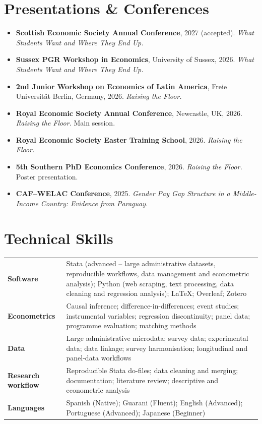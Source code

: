 \documentclass[10pt,a4paper]{article}
\begin{document}
\section{Presentations \& Conferences}
\begin{itemize}
  \item \textbf{Scottish Economic Society Annual Conference}, 2027 (accepted). \textit{What Students Want and Where They End Up.}
  \item \textbf{Sussex PGR Workshop in Economics}, University of Sussex, 2026. \textit{What Students Want and Where They End Up.}
  \item \textbf{2nd Junior Workshop on Economics of Latin America}, Freie Universität Berlin, Germany, 2026. \textit{Raising the Floor.}
  \item \textbf{Royal Economic Society Annual Conference}, Newcastle, UK, 2026. \textit{Raising the Floor.} Main session.
  \item \textbf{Royal Economic Society Easter Training School}, 2026. \textit{Raising the Floor.}
  \item \textbf{5th Southern PhD Economics Conference}, 2026. \textit{Raising the Floor.} Poster presentation.
  \item \textbf{CAF--WELAC Conference}, 2025. \textit{Gender Pay Gap Structure in a Middle-Income Country: Evidence from Paraguay.}
\end{itemize}

\section{Technical Skills}
{\small
\begin{tabularx}{\linewidth}{@{}p{3.1cm}X@{}}
\textbf{Software} & Stata (advanced -- large administrative datasets, reproducible workflows, data management and econometric analysis); Python (web scraping, text processing, data cleaning and regression analysis); \LaTeX; Overleaf; Zotero \\[0.3ex]
\textbf{Econometrics} & Causal inference; difference-in-differences; event studies; instrumental variables; regression discontinuity; panel data; programme evaluation; matching methods \\[0.3ex]
\textbf{Data} & Large administrative microdata; survey data; experimental data; data linkage; survey harmonisation; longitudinal and panel-data workflows \\[0.3ex]
\textbf{Research workflow} & Reproducible Stata do-files; data cleaning and merging; documentation; literature review; descriptive and econometric analysis \\[0.3ex]
\textbf{Languages} & Spanish (Native); Guarani (Fluent); English (Advanced); Portuguese (Advanced); Japanese (Beginner) \\
\end{tabularx}}
\end{document}

